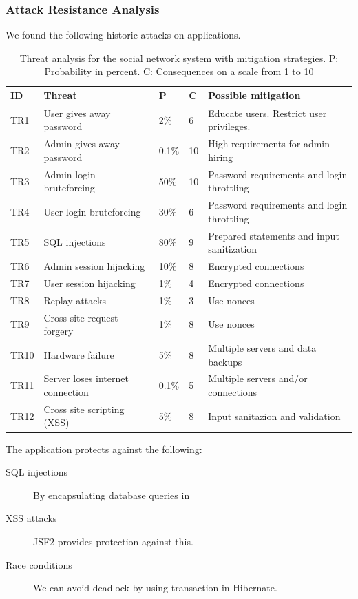 \documentclass[a4paper]{article}
\begin{document}
\subsubsection{Attack Resistance Analysis}
We found the following historic attacks on applications.

\begin{table}[h!]
	\begin{tabular}{| l | p{4cm} | l | l | p{5cm} |}
		\hline
		\textbf{ID} & \textbf{Threat} & \textbf{P} & \textbf{C} & \textbf{Possible mitigation} \\ \hline
		TR1 & User gives away password & 2\% & 6 & Educate users. Restrict user privileges. \\ \hline
        TR2 & Admin gives away password & 0.1\%  & 10 & High requirements for admin hiring \\ \hline
        TR3 & Admin login bruteforcing & 50\% & 10 & Password requirements and login throttling \\ \hline
        TR4 & User login bruteforcing & 30\% & 6 & Password requirements and login throttling \\ \hline
        TR5 & SQL injections & 80\% & 9 & Prepared statements and input sanitization \\ \hline
        TR6 & Admin session hijacking & 10\% & 8 & Encrypted connections \\ \hline
        TR7 & User session hijacking & 1\% & 4 & Encrypted connections \\ \hline
        TR8 & Replay attacks & 1\% & 3 & Use nonces \\ \hline
       	TR9 & Cross-site request forgery & 1\% & 8 & Use nonces \\ \hline
        TR10 & Hardware failure & 5\% & 8 & Multiple servers and data backups \\ \hline
        TR11 & Server loses internet connection & 0.1\% & 5 & Multiple servers and/or connections \\ \hline
        TR12 & Cross site scripting (XSS) & 5\% & 8 & Input sanitazion and validation \\ \hline
	\end{tabular}
	\caption{Threat analysis for the social network system with mitigation strategies. P: Probability in percent. C: Consequences on a scale from 1 to 10}
		\label{tab:threats}
\end{table}


The application protects against the following:
\begin{description}
\item[SQL injections] By encapsulating database queries in 
\item[XSS attacks] JSF2 provides protection against this.
\item[Race conditions] We can avoid deadlock by using transaction in Hibernate.
\end{description}
\end{document}
